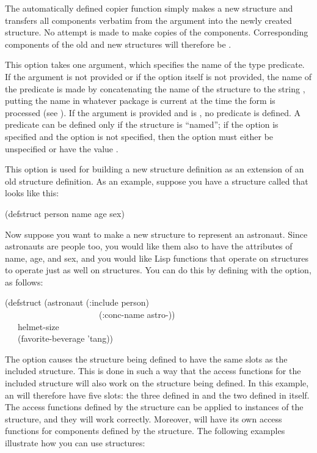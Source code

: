 \begin{flushdesc}
The automatically defined copier function simply makes a new structure
and transfers all components verbatim from the argument into the
newly created structure.  No attempt is made to make copies
of the components.  Corresponding components of the old and
new structures will therefore be .

\item[\cd{:predicate}]
This option takes one argument, which specifies the name of the type predicate.
If the argument is not provided or if the option itself is not
provided, the name of the predicate is made by concatenating the
name of the structure to the string , putting the name
in whatever package is current at the time the 
form is processed (see ).
If the argument is
provided and is {\false}, no predicate is defined.  A predicate can be defined
only if the structure is ``named'';
if the  option is specified
and the  option is
not specified, then the  option must either be unspecified
or have the value {\false}.

\item[\cd{:include}]
This option is used for building a new structure definition as
an extension of an old structure definition.  As an example,
suppose you have a structure called  that looks like this:
\begin{lisp}
(defstruct person name age sex)
\end{lisp}
Now suppose you want to make a new structure to represent an astronaut.
Since astronauts are people too, you would like them also to have the
attributes of name, age, and sex, and you would like Lisp functions
that operate on  structures to operate just as well on
 structures.  You can do this by defining 
with the  option, as follows:

\begin{lisp}
(defstruct (astronaut (:include person) \\
~~~~~~~~~~~~~~~~~~~~~~(:conc-name astro-)) \\
~~~helmet-size \\
~~~(favorite-beverage 'tang))
\end{lisp}

The  option causes the structure being defined
to have the same slots as the included structure.
This is done in such a way
that the access functions for the included
structure will also work on the structure being defined.
In this example, an
 will therefore have five slots: the three defined in
 and the two defined in 
itself.  The access functions defined by the  structure
can be applied to instances of the  structure, and they
will work correctly.
Moreover,  will have its own access functions for
components defined by the  structure.
The following examples illustrate how you can
use  structures:


\end{flushdesc}
